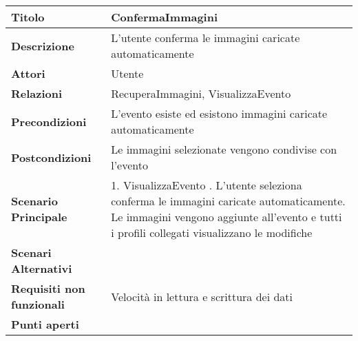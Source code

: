\begin{tabular} {|P{4.5cm}|P{11cm}|}
  \hline
  \textbf{Titolo}                   & ConfermaImmagini                                              \\
  \hline
  \textbf{Descrizione}              & L'utente conferma le immagini caricate automaticamente        \\
  \hline
  \textbf{Attori}                   & Utente                                                        \\
  \hline
  \textbf{Relazioni}                & RecuperaImmagini, VisualizzaEvento                            \\
  \hline
  \textbf{Precondizioni}            & L'evento esiste ed esistono immagini caricate automaticamente \\
  \hline
  \textbf{Postcondizioni}           & Le immagini selezionate vengono condivise con l'evento        \\
  \hline
  \textbf{Scenario Principale}      & 1. VisualizzaEvento . L'utente seleziona conferma le immagini caricate automaticamente. Le immagini vengono aggiunte all'evento e tutti i profili collegati visualizzano le modifiche  \\
  \hline
  \textbf{Scenari Alternativi}      &                                                               \\
  \hline
  \textbf{Requisiti non funzionali} & Velocità in lettura e scrittura dei dati                      \\
  \hline
  \textbf{Punti aperti}             &                                                               \\
  \hline
\end{tabular}
\hfill
\break

